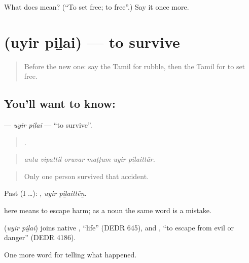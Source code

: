 \begin{tcolorbox}[breakable,colback=teal!4,colframe=teal!35!black,title={Before you move on}]
What does  mean? (\textquotedblleft{}To set free; to free\textquotedblright{}.) Say it once more.
\end{tcolorbox}
\section[\texorpdfstring{\ta{உயிர்} \ta{பிழை} (uyir piḻai)}{உயிர் பிழை (uyir piḻai)}]{  (uyir piḻai) — to survive}

\label{lesson:TA-C301-uyir-pilai}



\begin{quote}
Before the new one: say the Tamil for rubble, then the Tamil for to set free.
\end{quote}

\subsection*{You'll want to know:  }
\textbf{ } — \emph{uyir piḻai} — \textquotedblleft{}to survive\textquotedblright{}.

\begin{quote}
     .
\end{quote}

\begin{quote}
\emph{anta vipattil oruvar maṭṭum uyir piḻaittār.}
\end{quote}

\begin{quote}
Only one person survived that accident.
\end{quote}

Past (I …):  , \emph{uyir piḻaittēṉ}.

 here means to escape harm; as a noun the same word is a mistake.

\begin{cousinweb}
\textbf{ } (\emph{uyir piḻai}) joins native , \textquotedblleft{}life\textquotedblright{} (DEDR 645), and , \textquotedblleft{}to escape from evil or danger\textquotedblright{} (DEDR 4186).
\end{cousinweb}

\begin{grammarlens}[title={What you've built}]
One more word for telling what happened.
\end{grammarlens}

